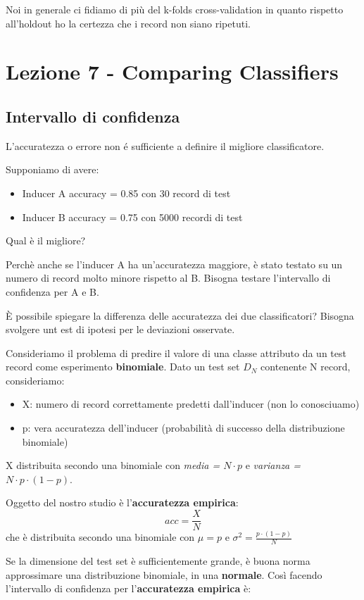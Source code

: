 Noi in generale ci fidiamo di pi\`u del k-folds cross-validation in quanto rispetto all'holdout ho la certezza che i record non siano ripetuti.

\section{Lezione 7 - Comparing Classifiers}
\subsection{Intervallo di confidenza}
L'accuratezza o errore non \'e sufficiente a definire il migliore classificatore.

Supponiamo di avere:
\begin{itemize}
	\item Inducer A accuracy = 0.85 con 30 record di test
	\item Inducer B accuracy = 0.75 con 5000 recordi di test
\end{itemize}
Qual \`e il migliore?

Perch\`e anche se l'inducer A ha un'accuratezza maggiore, \`e stato testato su un numero di record molto minore rispetto al B. Bisogna testare l'intervallo di confidenza per A e B.

\`E possibile spiegare la differenza delle accuratezza dei due classificatori? Bisogna svolgere unt est di ipotesi per le deviazioni osservate.

Consideriamo il problema di predire il valore di una classe attributo da un test record come esperimento \textbf{binomiale}. Dato un test set $D_N$ contenente N record, consideriamo:

\begin{itemize}
	\item X: numero di record correttamente predetti dall'inducer (non lo conosciuamo)
	\item p: vera accuratezza dell'inducer (probabilit\`a di successo della distribuzione binomiale)
\end{itemize}

X distribuita secondo una binomiale con \textit{media = $N \cdot p$} e \textit{varianza = $N \cdot p \cdot (1-p)$}. 

Oggetto del nostro studio \`e l'\textbf{accuratezza empirica}: \[acc = \frac{X}{N} \] che \`e distribuita secondo una binomiale con $\mu = p$ e $\sigma^2 = \frac{p \cdot (1-p)}{N}$

Se la dimensione del test set \`e sufficientemente grande, \`e buona norma approssimare una distribuzione binomiale, in una \textbf{normale}. Cos\`i facendo l'intervallo di confidenza per l'\textbf{accuratezza empirica} \`e:

